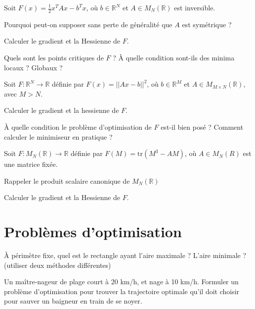 \documentclass[12pt,a4paper,fleqn]{report}
\newcommand{\R}{\mathbb R}
\begin{document}
\begin{exercice}
  Soit $F(x) = \frac 1 2 x^{T} A x - b^{T} x$, où $b \in \R^{N}$ et $A
  \in M_{N}(\R)$ est inversible.
  \begin{questions}
  \item Pourquoi peut-on supposer sans perte de généralité que $A$ est
    symétrique ?
  \item Calculer le gradient et la Hessienne de $F$.
  \item Quels sont les points critiques de $F$ ? À quelle condition
    sont-ils des minima locaux ? Globaux ?
  \end{questions}
\end{exercice}

\begin{exercice}
  Soit $F : \R^{N} \to \R$ définie par $F(x) = ||{A x - b}||^{2}$, où
  $b \in \R^{M}$ et $A \in M_{M \times N}(\R)$, avec $M > N$.
  \begin{questions}
  \item Calculer le gradient et la hessienne de $F$.
  \item À quelle condition le problème d'optimisation de $F$ est-il
    bien posé ? Comment calculer le minimiseur en pratique ?
  \end{questions}
\end{exercice}

\begin{exercice}
  Soit $F : M_{N}(\R) \to \R$ définie par $F(M) = \text{tr}(M^{3} - A
  M)$, où $A \in M_{N}(R)$ est une matrice fixée.
  \begin{questions}
  \item Rappeler le produit scalaire canonique de $M_{N}(\R)$
  \item Calculer le gradient et la Hessienne de $F$.
  \end{questions}
\end{exercice}

\section{Problèmes d'optimisation}

\begin{exercice}
  À périmètre fixe, quel est le rectangle ayant l'aire maximale ?
  L'aire minimale ? (utiliser deux méthodes différentes)
\end{exercice}

\begin{exercice}
  Un maître-nageur de plage court à 20 km/h, et nage à 10
  km/h. Formuler un problème d'optimisation pour trouver la
  trajectoire optimale qu'il doit choisir pour sauver un baigneur en
  train de se noyer.
\end{exercice}
\end{document}
